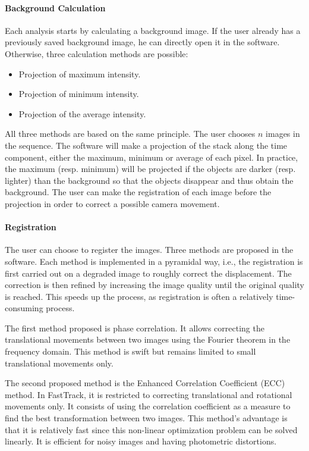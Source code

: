     \paragraph{Background Calculation}
    Each analysis starts by calculating a background image. If the user already has a previously saved background image, he can directly open it in the software. Otherwise, three calculation methods are possible:
    \begin{itemize}
        \item Projection of maximum intensity.
        \item Projection of minimum intensity.
        \item Projection of the average intensity.
    \end{itemize}
    All three methods are based on the same principle. The user chooses $n$ images in the sequence. The software will make a projection of the stack along the time component, either the maximum, minimum or average of each pixel. In practice, the maximum (resp. minimum) will be projected if the objects are darker (resp. lighter) than the background so that the objects disappear and thus obtain the background. The user can make the registration of each image before the projection in order to correct a possible camera movement.

    \paragraph{Registration}
    The user can choose to register the images. Three methods are proposed in the software. Each method is implemented in a pyramidal way, i.e., the registration is first carried out on a degraded image to roughly correct the displacement. The correction is then refined by increasing the image quality until the original quality is reached. This speeds up the process, as registration is often a relatively time-consuming process.

    The first method proposed is phase correlation. It allows correcting the translational movements between two images using the Fourier theorem in the frequency domain. This method is swift but remains limited to small translational movements only.

    The second proposed method is the Enhanced Correlation Coefficient (ECC) \cite{evangelidis2008parametric} method. In FastTrack, it is restricted to correcting translational and rotational movements only. It consists of using the correlation coefficient as a measure to find the best transformation between two images. This method's advantage is that it is relatively fast since this non-linear optimization problem can be solved linearly. It is efficient for noisy images and having photometric distortions.

